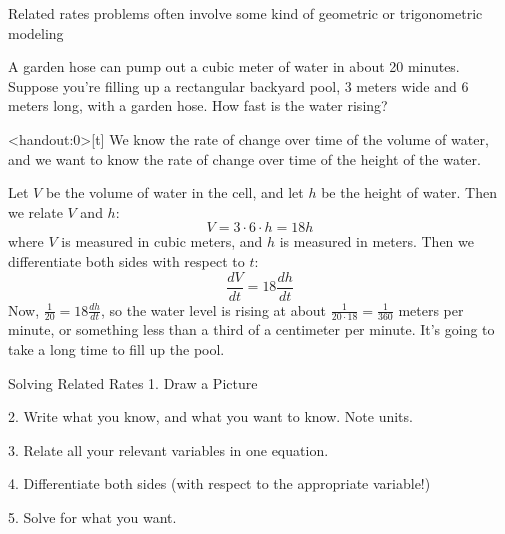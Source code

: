 \begin{frame}[t]
\begin{center}\color{C3}
Related rates problems often involve some kind of geometric or trigonometric modeling
\end{center}
\AnswerYes



A garden hose can pump out a cubic meter of water in about 20 minutes. Suppose you're filling up a rectangular backyard pool, 3 meters wide and 6 meters long, with a garden hose. How fast is the water rising?
\end{frame}
\begin{frame}<handout:0>[t]
\color{answercolor}
We know the rate of change over time of the volume of water, and we want to know the rate of change over time of the height of the water.

\bigskip
 Let $V$ be the volume of water in the cell, and let $h$ be the height of water. Then we relate $V$ and $h$:
\[V = 3 \cdot 6 \cdot h = 18h\]
where $V$ is measured in cubic meters, and $h$ is measured in meters. Then we differentiate both sides with respect to $t$:
\[\frac{dV}{dt} = 18\frac{dh}{dt}\]
Now, $\frac{1}{20} = 18\frac{dh}{dt}$, so the water level is rising at about $\frac{1}{20\cdot 18} = \frac{1}{360}$ meters per minute, or something less than a third of a centimeter per minute. It's going to take a long time to fill up the pool.
\end{frame}
\begin{frame}{Solving Related Rates}
1. Draw a Picture
\vfill

2. Write what you know, and what you want to know. Note units.\vfill

\color{M4}3. Relate all your relevant variables in one equation.\vfill\color{black}

4. Differentiate both sides (with respect to the appropriate variable!)\vfill

5. Solve for what you want.

\end{frame}

